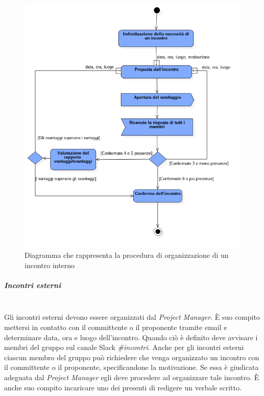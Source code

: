			\begin{figure}
				\centering
				\includegraphics[width=1\textwidth]{Images/umlincontri.png}
				\caption{Diagramma che rappresenta la procedura di organizzazione di un incontro interno}
			\end{figure}
			
			\subparagraph{Incontri esterni} \mbox{} \\
			 Gli incontri esterni devono essere organizzati dal \emph{Project Manager}. È suo compito mettersi in contatto con il committente o il proponente tramite email e determinare data, ora e luogo dell'incontro. Quando ciò è definito deve avvisare i membri del gruppo sul canale Slack \emph{\#incontri}. Anche per gli incontri esterni ciascun membro del gruppo può richiedere che venga organizzato un incontro con il committente o il proponente, specificandone la motivazione. Se essa è giudicata adeguata dal \emph{Project Manager} egli deve procedere ad organizzare tale incontro. È anche suo compito incaricare uno dei presenti di redigere un verbale scritto.
